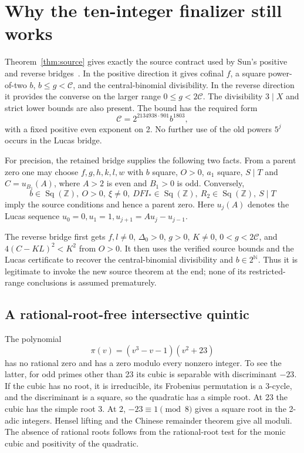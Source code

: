 \documentclass[11pt,letterpaper]{article}
\theoremstyle{definition}\newtheorem{definition}[theorem]{Definition}
\theoremstyle{remark}\newtheorem{remark}[theorem]{Remark}
\newcommand{\N}{\mathbb N}
\newcommand{\Z}{\mathbb Z}
\newcommand{\Sq}{\operatorname{Sq}}
\newcommand{\cC}{\mathcal C}
\begin{document}
\section{Why the ten-integer finalizer still works}\label{sec:finalproof}

Theorem~\ref{thm:source} gives exactly the source contract used by Sun's positive and reverse bridges~\cite{sun2021,sun2026}. In the positive direction it gives cofinal $f$, a square power-of-two $b$, $b\le g<\cC$, and the central-binomial divisibility. In the reverse direction it provides the converse on the larger range $0\le g<2\cC$. The divisibility $3\mid X$ and strict lower bounds are also present. The bound has the required form
\[
 \cC=2^{2134938\cdot901}b^{1803},
\]
with a fixed positive even exponent on 2. No further use of the old powers $5^j$ occurs in the Lucas bridge.

For precision, the retained bridge supplies the following two facts. From a parent zero one may choose $f,g,h,k,l,w$ with $b$ square, $O>0$, $a_1$ square, $S\mid T$ and $C=u_{B_1}(A)$, where $A>2$ is even and $B_1>0$ is odd. Conversely,
\begin{equation}\label{eq:reversecontract}
 b\in\Sq(\Z),\ O>0,\ \xi\ne0,\ DFI_*\in\Sq(\Z),\
 R_2\in\Sq(\Z),\ S\mid T
\end{equation}
imply the source conditions and hence a parent zero. Here $u_j(A)$ denotes the Lucas sequence $u_0=0,u_1=1,u_{j+1}=Au_j-u_{j-1}$.

The reverse bridge first gets $f,l\ne0$, $\Delta_0>0$, $g>0$, $K\ne0$, $0<g<2\cC$, and $4(C-KL)^2<K^2$ from $O>0$. It then uses the verified source bounds and the Lucas certificate to recover the central-binomial divisibility and $b\in2^{\N}$. Thus it is legitimate to invoke the new source theorem at the end; none of its restricted-range conclusions is assumed prematurely.

\subsection{A rational-root-free intersective quintic}

The polynomial
\[
 \pi(v)=(v^3-v-1)(v^2+23)
\]
has no rational zero and has a zero modulo every nonzero integer. To see the latter, for odd primes other than 23 its cubic is separable with discriminant $-23$. If the cubic has no root, it is irreducible, its Frobenius permutation is a 3-cycle, and the discriminant is a square, so the quadratic has a simple root. At 23 the cubic has the simple root 3. At 2, $-23\equiv1\pmod8$ gives a square root in the 2-adic integers. Hensel lifting and the Chinese remainder theorem give all moduli. The absence of rational roots follows from the rational-root test for the monic cubic and positivity of the quadratic.
\end{document}
